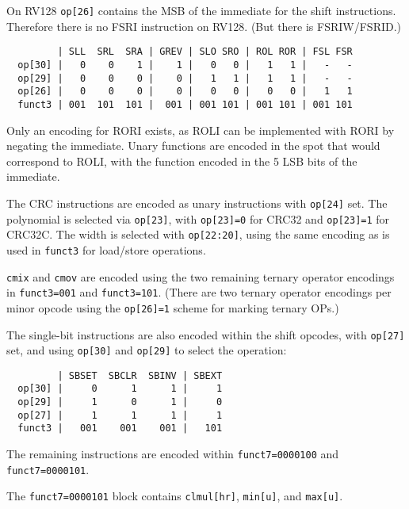 On RV128 {\tt op[26]} contains the MSB of the immediate for the shift instructions.
Therefore there is no FSRI instruction on RV128. (But there is FSRIW/FSRID.)

\begin{minipage}{\linewidth}
\begin{verbatim}
         | SLL  SRL  SRA | GREV | SLO SRO | ROL ROR | FSL FSR
  op[30] |   0    0    1 |    1 |   0   0 |   1   1 |   -   -
  op[29] |   0    0    0 |    0 |   1   1 |   1   1 |   -   -
  op[26] |   0    0    0 |    0 |   0   0 |   0   0 |   1   1
  funct3 | 001  101  101 |  001 | 001 101 | 001 101 | 001 101
\end{verbatim}
\end{minipage}

Only an encoding for RORI exists, as ROLI can be implemented with RORI by negating
the immediate. Unary functions are encoded in the spot that would correspond to ROLI,
with the function encoded in the 5 LSB bits of the immediate.

The CRC instructions are encoded as unary instructions with {\tt op[24]} set. The
polynomial is selected via {\tt op[23]}, with {\tt op[23]=0} for CRC32 and
{\tt op[23]=1} for CRC32C. The width is selected with {\tt op[22:20]}, using
the same encoding as is used in {\tt funct3} for load/store operations.

{\tt cmix} and {\tt cmov} are encoded using the two remaining ternary operator
encodings in {\tt funct3=001} and {\tt funct3=101}. (There are two ternary
operator encodings per minor opcode using the {\tt op[26]=1} scheme for
marking ternary OPs.)

The single-bit instructions are also encoded within the shift opcodes, with
{\tt op[27]} set, and using {\tt op[30]} and {\tt op[29]} to select the operation:

\begin{minipage}{\linewidth}
\begin{verbatim}
         | SBSET  SBCLR  SBINV | SBEXT
  op[30] |     0      1      1 |     1
  op[29] |     1      0      1 |     0
  op[27] |     1      1      1 |     1
  funct3 |   001    001    001 |   101
\end{verbatim}
\end{minipage}

The remaining instructions are encoded within {\tt funct7=0000100} and
{\tt funct7=0000101}.

The {\tt funct7=0000101} block contains {\tt clmul[hr]},
{\tt min[u]}, and {\tt max[u]}.

